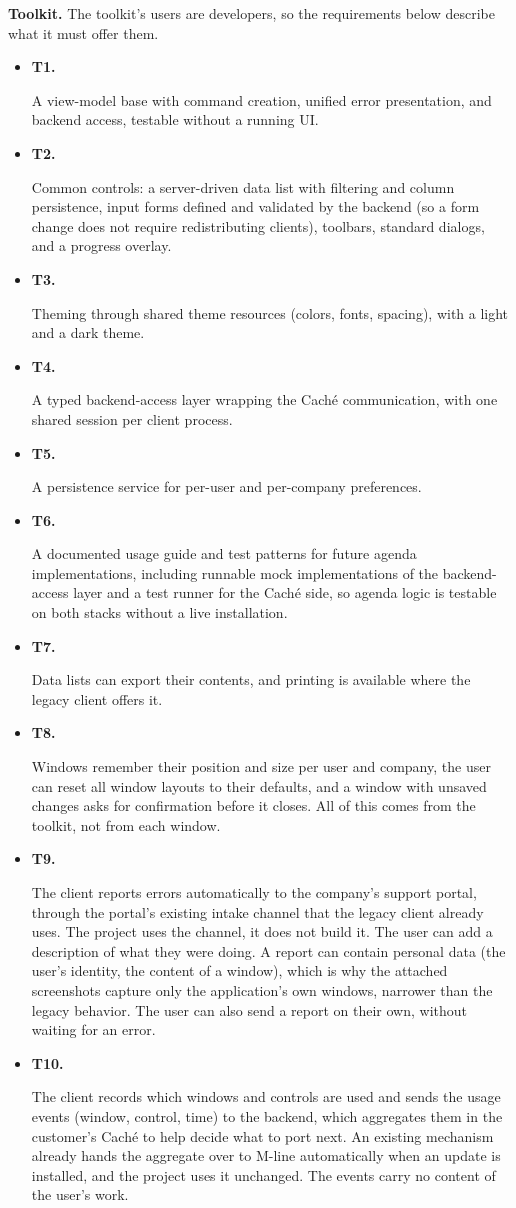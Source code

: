 \documentclass{article}
\newcommand{\reqdef}[1]{\hypertarget{req:#1}{\textbf{#1.}}}
\begin{document}
\noindent \textbf{Toolkit.} The toolkit's users are developers, so the requirements below describe what it must offer them.
\begin{itemize}
  \item \reqdef{T1} A view-model base with command creation, unified error presentation, and backend access, testable without a running UI.
  \item \reqdef{T2} Common controls: a server-driven data list with filtering and column persistence, input forms defined and validated by the backend (so a form change does not require redistributing clients), toolbars, standard dialogs, and a progress overlay.
  \item \reqdef{T3} Theming through shared theme resources (colors, fonts, spacing), with a light and a dark theme.
  \item \reqdef{T4} A typed backend-access layer wrapping the Caché communication, with one shared session per client process.
  \item \reqdef{T5} A persistence service for per-user and per-company preferences.
  \item \reqdef{T6} A documented usage guide and test patterns for future agenda implementations, including runnable mock implementations of the backend-access layer and a test runner for the Caché side, so agenda logic is testable on both stacks without a live installation.
  \item \reqdef{T7} Data lists can export their contents, and printing is available where the legacy client offers it.
  \item \reqdef{T8} Windows remember their position and size per user and company, the user can reset all window layouts to their defaults, and a window with unsaved changes asks for confirmation before it closes. All of this comes from the toolkit, not from each window.
  \item \reqdef{T9} The client reports errors automatically to the company's support portal, through the portal's existing intake channel that the legacy client already uses. The project uses the channel, it does not build it. The user can add a description of what they were doing. A report can contain personal data (the user's identity, the content of a window), which is why the attached screenshots capture only the application's own windows, narrower than the legacy behavior. The user can also send a report on their own, without waiting for an error.
  \item \reqdef{T10} The client records which windows and controls are used and sends the usage events (window, control, time) to the backend, which aggregates them in the customer's Caché to help decide what to port next. An existing mechanism already hands the aggregate over to M-line automatically when an update is installed, and the project uses it unchanged. The events carry no content of the user's work.

\end{itemize}
\end{document}
